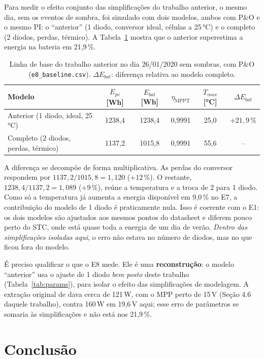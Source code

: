 \documentclass[3p,authoryear]{elsarticle}
\newcommand{\etaM}{\eta_{\mathrm{MPPT}}}
\begin{document}
Para medir o efeito conjunto das simplificações do trabalho anterior, o mesmo dia, sem os
eventos de sombra, foi simulado com dois modelos, ambos com P\&O e o mesmo PI: o
``anterior'' (1 diodo, conversor ideal, células a 25\,°C) e o completo (2 diodos, perdas,
térmico). A Tabela~\ref{tab:e8} mostra que o anterior superestima a energia na bateria em
21,9\,\%.

\begin{table}[!htbp]
\centering\small
\begin{tabular}{lccccc}
\toprule
Modelo & $E_{pv}$ [Wh] & $E_{bat}$ [Wh] & $\etaM$ & $T_{max}$ [°C] & $\Delta E_{bat}$ \\
\midrule
Anterior (1 diodo, ideal, 25\,°C) & 1238,4 & 1238,4 & 0,9991 & 25,0 & $+21{,}9\,\%$ \\
Completo (2 diodos, perdas, térmico) & 1137,2 & 1015,8 & 0,9991 & 55,6 & -- \\
\bottomrule
\end{tabular}
\caption{Linha de base do trabalho anterior no dia 26/01/2020 sem sombras, com P\&O
(\texttt{e8\_baseline.csv}). $\Delta E_{bat}$: diferença relativa ao modelo completo.}
\label{tab:e8}
\end{table}

A diferença se decompõe de forma multiplicativa. As perdas do conversor respondem por
$1137{,}2/1015{,}8 = 1{,}120$ ($+12\,\%$). O restante, $1238{,}4/1137{,}2 = 1{,}089$ ($+9\,\%$),
reúne a temperatura e a troca de 2 para 1 diodo. Como só a temperatura já aumenta a energia
disponível em 9,0\,\% no E7, a contribuição do modelo de 1 diodo é praticamente nula. Isso
é coerente com o E1: os dois modelos são ajustados aos mesmos pontos do datasheet e diferem
pouco perto do STC, onde está quase toda a energia de um dia de verão. \emph{Dentro das
simplificações isoladas aqui}, o erro não estava no número de diodos, mas no que ficou fora
do modelo.

É preciso qualificar o que o E8 mede. Ele é uma \textbf{reconstrução}: o modelo
``anterior'' usa o ajuste de 1 diodo \emph{bem posto} deste trabalho (Tabela~\ref{tab:params}),
para isolar o efeito das simplificações de modelagem. A extração original de
\citet{anterior} dava cerca de 121\,W, com o MPP perto de 15\,V (Seção 4.6 daquele
trabalho), contra 160\,W em 19,6\,V aqui; esse erro de parâmetros se somaria às
simplificações e não está nos 21,9\,\%.

\section{Conclusão}
\label{sec:conclusao}
\end{document}
